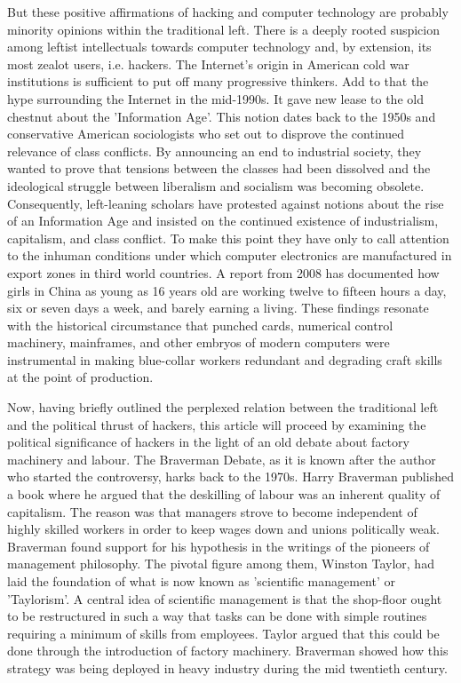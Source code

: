 But these positive af\hbox{}f\hbox{}irmations of hacking and computer technology
are probably minority opinions within the traditional left. There is a deeply
rooted suspicion among leftist intellectuals towards computer technology and, by
extension, its most zealot users, i.e. hackers. The Internet's origin in
American cold war institutions is suf\hbox{}f\hbox{}icient to put of\hbox{}f
many progressive thinkers\cite{gnunited-edwards96, gnunited-shiller99}. Add to
that the hype surrounding the Internet in the mid-1990s. It gave new lease to
the old chestnut about the 'Information Age'. This notion dates back to the
1950s and conservative American sociologists who set out to disprove the
continued relevance of class conf\hbox{}licts.  By announcing an end to
industrial society, they wanted to prove that tensions between the classes had
been dissolved and the ideological struggle between liberalism and socialism was
becoming obsolete.  Consequently, left-leaning scholars have protested against
notions about the rise of an Information Age and insisted on the continued
existence of industrialism, capitalism, and class
conf\hbox{}lict\cite{gnunited-webster02}. To make this point they have only to
call attention to the inhuman conditions under which computer electronics are
manufactured in export zones in third world
countries\cite{gnunited-sussman_lent98}. A report from 2008 has documented how
girls in China as young as 16 years old are working twelve to f\hbox{}ifteen
hours a day, six or seven days a week, and barely earning a
living\cite{gnunited-weed08}. These f\hbox{}indings resonate with the historical
circumstance that punched cards, numerical control machinery, mainframes, and
other embryos of modern computers were instrumental in making blue-collar
workers redundant and degrading craft skills at the point of
production\cite{gnunited-braverman74, gnunited-kraft77}.

Now, having brief\hbox{}ly outlined the perplexed relation between the
traditional left and the political thrust of hackers, this article will proceed
by examining the political signif\hbox{}icance of hackers in the light of an old
debate about factory machinery and labour. The Braverman Debate, as it is known
after the author who started the controversy, harks back to the 1970s. Harry
Braverman published a book where he argued that the deskilling of labour was an
inherent quality of capitalism. The reason was that managers strove to become
independent of highly skilled workers in order to keep wages down and unions
politically weak.  Braverman found support for his hypothesis in the writings of
the pioneers of management philosophy. The pivotal f\hbox{}igure among them,
Winston Taylor, had laid the foundation of what is now known as
'scientif\hbox{}ic management' or 'Taylorism'. A central idea of
scientif\hbox{}ic management is that the shop-f\hbox{}loor ought to be
restructured in such a way that tasks can be done with simple routines requiring
a minimum of skills from employees. Taylor argued that this could be done
through the introduction of factory machinery. Braverman showed how this
strategy was being deployed in heavy industry during the mid twentieth century.

